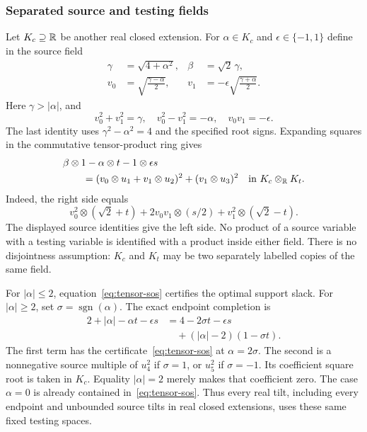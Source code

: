 \subsubsection{Separated source and testing fields}
Let $K_c\supseteq\mathbb R$ be another real closed extension. For $\alpha\in K_c$ and $\epsilon\in\{-1,1\}$ define in the source field
\begin{align*}
 \gamma&=\sqrt{4+\alpha^2},&\beta&=\sqrt2\,\gamma,\\
 v_0&=\sqrt{\frac{\gamma-\alpha}{2}},&
 v_1&=-\epsilon\sqrt{\frac{\gamma+\alpha}{2}}.
\end{align*}
Here $\gamma>|\alpha|$, and
\[
 v_0^2+v_1^2=\gamma,\quad v_0^2-v_1^2=-\alpha,
 \quad v_0v_1=-\epsilon.
\]
The last identity uses $\gamma^2-\alpha^2=4$ and the specified root signs. Expanding squares in the commutative tensor-product ring gives
\begin{equation}\label{eq:tensor-sos}
 \begin{aligned}
 &\beta\otimes1-\alpha\otimes t-1\otimes\epsilon s\\
 &\qquad=(v_0\otimes u_1+v_1\otimes u_2)^2
                 +(v_1\otimes u_3)^2
       \quad\text{in }K_c\otimes_{\mathbb R}K_t.
 \end{aligned}
\end{equation}
Indeed, the right side equals
\[
 v_0^2\otimes(\sqrt2+t)+2v_0v_1\otimes(s/2)
       +v_1^2\otimes(\sqrt2-t).
\]
The displayed source identities give the left side. No product of a source variable with a testing variable is identified with a product inside either field. There is no disjointness assumption: $K_c$ and $K_t$ may be two separately labelled copies of the same field.

For $|\alpha|\le2$, equation~\eqref{eq:tensor-sos} certifies the optimal support slack. For $|\alpha|\ge2$, set $\sigma=\operatorname{sgn}(\alpha)$. The exact endpoint completion is
\begin{equation}\label{eq:endpoint}
 \begin{aligned}
 2+|\alpha|-\alpha t-\epsilon s
 &=4-2\sigma t-\epsilon s\\
 &\quad+(|\alpha|-2)(1-\sigma t).
 \end{aligned}
\end{equation}
The first term has the certificate~\eqref{eq:tensor-sos} at $\alpha=2\sigma$. The second is a nonnegative source multiple of $u_4^2$ if $\sigma=1$, or $u_5^2$ if $\sigma=-1$. Its coefficient square root is taken in $K_c$. Equality $|\alpha|=2$ merely makes that coefficient zero. The case $\alpha=0$ is already contained in~\eqref{eq:tensor-sos}. Thus every real tilt, including every endpoint and unbounded source tilts in real closed extensions, uses these same fixed testing spaces.

